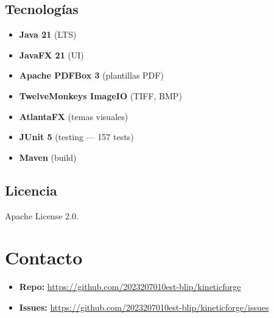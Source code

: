 \documentclass[12pt,a4paper]{article}
\begin{document}
\subsection{Tecnologías}
\begin{itemize}[leftmargin=*]
    \item \textbf{Java 21} (LTS)
    \item \textbf{JavaFX 21} (UI)
    \item \textbf{Apache PDFBox 3} (plantillas PDF)
    \item \textbf{TwelveMonkeys ImageIO} (TIFF, BMP)
    \item \textbf{AtlantaFX} (temas visuales)
    \item \textbf{JUnit 5} (testing — 157 tests)
    \item \textbf{Maven} (build)
\end{itemize}

\subsection{Licencia}

Apache License 2.0.

\section{Contacto}

\begin{itemize}[leftmargin=*]
    \item \textbf{Repo:} \url{https://github.com/2023207010est-blip/kineticforge}
    \item \textbf{Issues:} \url{https://github.com/2023207010est-blip/kineticforge/issues}
\end{itemize}
\end{document}
